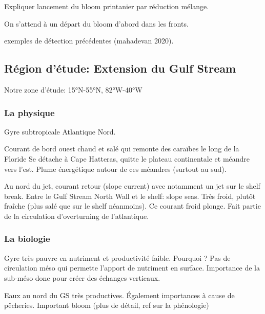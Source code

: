 Expliquer lancement du bloom printanier par réduction mélange.

On s'attend à un départ du bloom d'abord dans les fronts.

exemples de détection précédentes (mahadevan 2020).


\subsection{Région d'étude: Extension du Gulf Stream}
\label{sec:region-detude}

Notre zone d'étude: 15°N-55°N, 82°W-40°W

\subsubsection{La physique}
\label{sec:gs-physique}

Gyre subtropicale Atlantique Nord.

Courant de bord ouest chaud et salé qui remonte des caraïbes le long de la Floride
Se détache à Cape Hatteras, quitte le plateau continentale et méandre vers l'est.
Plume énergétique autour de ces méandres (surtout au sud).

Au nord du jet, courant retour (slope current) avec notamment un jet sur le shelf break.
Entre le Gulf Stream North Wall et le shelf: slope seas. Très froid, plutôt fraîche (plus salé que sur le shelf néanmoins).
Ce courant froid plonge. Fait partie de la circulation d'overturning de l'atlantique.

\subsubsection{La biologie}
\label{sec:gs-biologie}

Gyre très pauvre en nutriment et productivité faible.
Pourquoi ?
Pas de circulation méso qui permette l'apport de nutriment en surface.
Importance de la sub-méso donc pour créer des échanges verticaux.

Eaux au nord du GS très productives.
Également importances à cause de pêcheries.
Important bloom (plus de détail, ref sur la phénologie)

